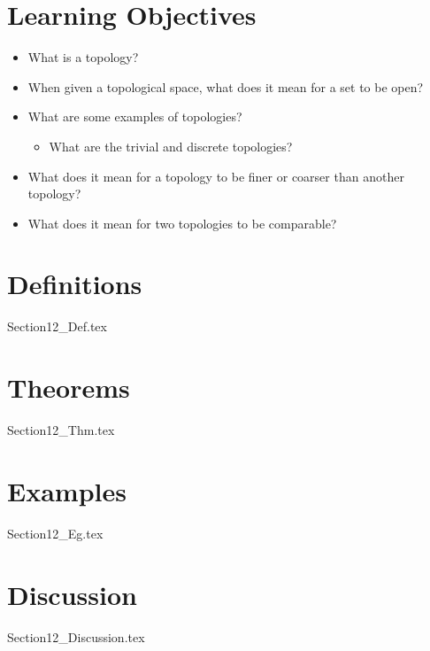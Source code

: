 \section{Learning Objectives}

\begin{itemize}
    \item What is a topology?
    \item When given a topological space, what does it mean for a set to be 
        open?
    \item What are some examples of topologies?
        \begin{itemize}
            \item What are the trivial and discrete topologies?
        \end{itemize}
    \item What does it mean for a topology to be finer or coarser than another
        topology?
    \item What does it mean for two topologies to be comparable?
\end{itemize}

\section{Definitions}

{Section12_Def.tex}

\section{Theorems}

{Section12_Thm.tex}

\section{Examples}

{Section12_Eg.tex}

\section{Discussion}

{Section12_Discussion.tex}